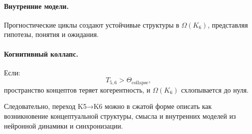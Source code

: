 \paragraph{Внутренние модели.}
Прогностические циклы создают устойчивые структуры в $\Omega(K_6)$, представляя
гипотезы, понятия и ожидания.

\paragraph{Когнитивный коллапс.}
Если:
\[
T_{5,6} > \Theta_{\mathrm{collapse}},
\]
пространство концептов теряет когерентность, и $\Omega(K_6)$ схлопывается до нуля.

Следовательно, переход K5→K6 можно в сжатой форме описать как возникновение
концептуальной структуры, смысла и внутренних моделей из нейронной динамики
и синхронизации.
